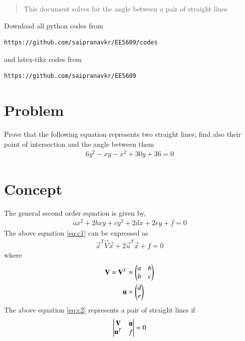 \documentclass[journal,12pt,twocolumn]{IEEEtran}
\begin{document}
%
\begin{abstract}
This document solves for the angle between a pair of straight lines
\end{abstract}
Download all python codes from 
%
\begin{lstlisting}
https://github.com/saipranavkr/EE5609/codes
\end{lstlisting}
%
and latex-tikz codes from 
%
\begin{lstlisting}
https://github.com/saipranavkr/EE5609
\end{lstlisting}
%
\renewcommand{\theenumi}{\roman{enumi}}%
\section{Problem}
Prove that the following equation represents two straight lines; find also their point of intersection and the angle between them
\begin{align} 
    6y^{2}-xy-x^{2}+30y+36=0 \nonumber
\end{align}
%
%
\section{Concept}
The general second order equation is given by,
\begin{align} \label{eq:c1}
    ax^2+2bxy+cy^2+2dx+2ey+f=0 
\end{align}
The above equation \eqref{eq:c1} can be expressed as
\begin{align} \label{eq:c2}
    \vec{x}^T\vec{V}\vec{x}+2\vec{u}^T\vec{x}+f=0
\end{align}
where
\begin{align}
    \mathbf{V}=\mathbf{V}^T&=\begin{pmatrix}a & b \\ b & c\end{pmatrix} \label{eq:c3}\\
    \mathbf{u}&=\begin{pmatrix}d \\ e\end{pmatrix} \label{eq:c4}
\end{align}
The above equation \eqref{eq:c2} represents a pair of straight lines if
\begin{align} \label{eq:c5}
    \begin{vmatrix}\mathbf{V} & \mathbf{u} \\ \mathbf{u}^T & f\end{vmatrix} = 0
\end{align}
\end{document}
